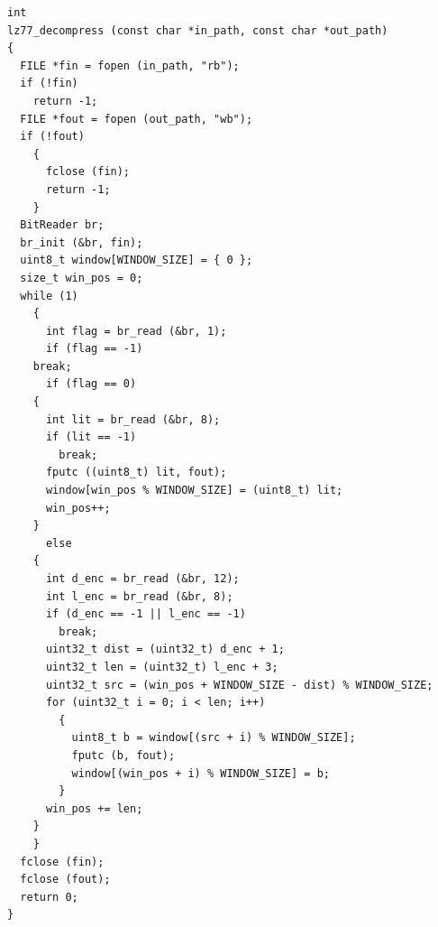 \documentclass[a4paper,14pt]{extreport}
\begin{document}
\begin{verbatim}
int
lz77_decompress (const char *in_path, const char *out_path)
{
  FILE *fin = fopen (in_path, "rb");
  if (!fin)
    return -1;
  FILE *fout = fopen (out_path, "wb");
  if (!fout)
    {
      fclose (fin);
      return -1;
    }
  BitReader br;
  br_init (&br, fin);
  uint8_t window[WINDOW_SIZE] = { 0 };
  size_t win_pos = 0;
  while (1)
    {
      int flag = br_read (&br, 1);
      if (flag == -1)
	break;
      if (flag == 0)
	{
	  int lit = br_read (&br, 8);
	  if (lit == -1)
	    break;
	  fputc ((uint8_t) lit, fout);
	  window[win_pos % WINDOW_SIZE] = (uint8_t) lit;
	  win_pos++;
	}
      else
	{
	  int d_enc = br_read (&br, 12);
	  int l_enc = br_read (&br, 8);
	  if (d_enc == -1 || l_enc == -1)
	    break;
	  uint32_t dist = (uint32_t) d_enc + 1;
	  uint32_t len = (uint32_t) l_enc + 3;
	  uint32_t src = (win_pos + WINDOW_SIZE - dist) % WINDOW_SIZE;
	  for (uint32_t i = 0; i < len; i++)
	    {
	      uint8_t b = window[(src + i) % WINDOW_SIZE];
	      fputc (b, fout);
	      window[(win_pos + i) % WINDOW_SIZE] = b;
	    }
	  win_pos += len;
	}
    }
  fclose (fin);
  fclose (fout);
  return 0;
}
\end{verbatim}
\end{document}
